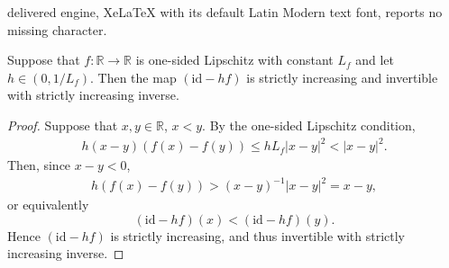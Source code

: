 \documentclass[10pt,a4paper]{amsart}
\newcommand{\R}{\mathbb R}
\newcommand{\id}{\mathrm{id}}
\begin{document}
delivered engine, XeLaTeX with its default Latin Modern text font, reports no missing character.
		\begin{lemma}\label{lem:invertible-implicit}
			Suppose that $f \colon \R \to \R$ is one-sided Lipschitz with constant $L_f$ and let $h \in (0, 1/L_f)$. Then the map $(\id - h f)$ is strictly increasing and invertible with strictly increasing inverse.
		\end{lemma}

		\begin{proof}
			Suppose that $x, y \in \R$, $x < y$. By the one-sided Lipschitz condition,
			\begin{equation}
				\begin{split}
					h (x - y)(f(x) - f(y)) \leq h L_f |x - y|^2 < |x - y|^2.
				\end{split}
			\end{equation}
			Then, since $x - y < 0$,
			\begin{equation}
				\begin{split}
					h (f(x) - f(y)) > (x - y)^{-1}|x - y|^2 = x - y,
				\end{split}
			\end{equation}
			or equivalently
			\begin{equation}
				(\id - h f)(x) < (\id - h f)(y).
			\end{equation}
			Hence $(\id - h f)$ is strictly increasing, and thus invertible with strictly increasing inverse.
		\end{proof}
\end{document}
